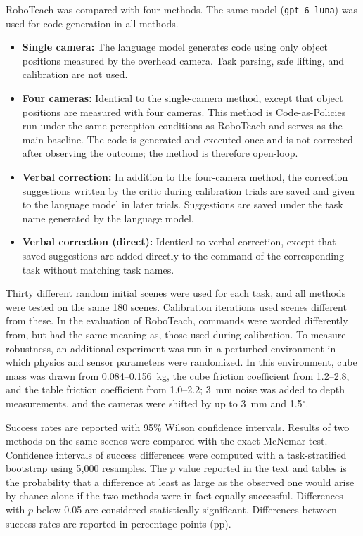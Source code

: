 \documentclass[preprint,12pt]{elsarticle}
\begin{document}
RoboTeach was compared with four methods. The same model (\texttt{gpt-6-luna}) was used for code generation in all methods.
\begin{itemize}[leftmargin=*]
\item \textbf{Single camera:} The language model generates code using only object positions measured by the overhead camera. Task parsing, safe lifting, and calibration are not used.
\item \textbf{Four cameras:} Identical to the single-camera method, except that object positions are measured with four cameras. This method is Code-as-Policies~\cite{liang2023cap} run under the same perception conditions as RoboTeach and serves as the main baseline. The code is generated and executed once and is not corrected after observing the outcome; the method is therefore open-loop.
\item \textbf{Verbal correction:} In addition to the four-camera method, the correction suggestions written by the critic during calibration trials are saved and given to the language model in later trials. Suggestions are saved under the task name generated by the language model.
\item \textbf{Verbal correction (direct):} Identical to verbal correction, except that saved suggestions are added directly to the command of the corresponding task without matching task names.
\end{itemize}

Thirty different random initial scenes were used for each task, and all methods were tested on the same 180 scenes. Calibration iterations used scenes different from these. In the evaluation of RoboTeach, commands were worded differently from, but had the same meaning as, those used during calibration. To measure robustness, an additional experiment was run in a perturbed environment in which physics and sensor parameters were randomized. In this environment, cube mass was drawn from 0.084--0.156~kg, the cube friction coefficient from 1.2--2.8, and the table friction coefficient from 1.0--2.2; 3~mm noise was added to depth measurements, and the cameras were shifted by up to 3~mm and 1.5$^\circ$.

Success rates are reported with 95\% Wilson confidence intervals. Results of two methods on the same scenes were compared with the exact McNemar test. Confidence intervals of success differences were computed with a task-stratified bootstrap using 5,000 resamples. The $p$ value reported in the text and tables is the probability that a difference at least as large as the observed one would arise by chance alone if the two methods were in fact equally successful. Differences with $p$ below 0.05 are considered statistically significant. Differences between success rates are reported in percentage points (pp).
\end{document}
